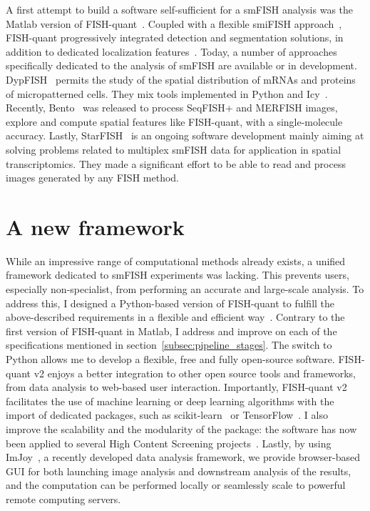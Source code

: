 A first attempt to build a software self-sufficient for a \ac{smFISH} analysis was the Matlab version of FISH-quant~\cite{mueller_fish-quant_2013}.
Coupled with a flexible \ac{smiFISH} approach~\cite{tsanov_smifish_2016}, FISH-quant progressively integrated detection and segmentation solutions, in addition to dedicated localization features~\cite{samacoits_computational_2018}.
Today, a number of approaches specifically dedicated to the analysis of \ac{smFISH} are available or in development.
DypFISH~\cite{savulescu_dypfish_2019,savulescu_interrogating_2021} permits the study of the spatial distribution of \ac{mRNA}s and proteins of micropatterned cells.
They mix tools implemented in Python and Icy~\cite{de_chaumont_icy_2012}.
Recently, Bento~\cite{mah_bento_2022} was released to process \ac{SeqFISH}+ and \ac{MERFISH} images, explore and compute spatial features like FISH-quant, with a single-molecule accuracy.
Lastly, StarFISH~\cite{perkel_starfish_2019} is an ongoing software development mainly aiming at solving problems related to multiplex \ac{smFISH} data for application in spatial transcriptomics.
They made a significant effort to be able to read and process images generated by any \ac{FISH} method.

\section{A new framework}
\label{sec:fqv2}

While an impressive range of computational methods already exists, a unified framework dedicated to \ac{smFISH} experiments was lacking.
This prevents users, especially non-specialist, from performing an accurate and large-scale analysis.
To address this, I designed a Python-based version of FISH-quant to fulfill the above-described requirements in a flexible and efficient way~\cite{Imbert_fq_2022}.
Contrary to the first version of FISH-quant in Matlab, I address and improve on each of the specifications mentioned in section~\ref{subsec:pipeline_stages}.
The switch to Python allows me to develop a flexible, free and fully open-source software.
FISH-quant v2 enjoys a better integration to other open source tools and frameworks, from data analysis to web-based user interaction.
Importantly, FISH-quant v2 facilitates the use of machine learning or deep learning algorithms with the import of dedicated packages, such as scikit-learn~\cite{pedregosa11a_scikitlearn} or TensorFlow~\cite{tensorflow_2015}.
I also improve the scalability and the modularity of the package: the software has now been applied to several High Content Screening projects~\cite{CHOUAIB_2020,safieddine_choreography_2021,pichon_kinesin_2021}.
Lastly, by using ImJoy~\cite{ouyang_imjoy_2019}, a recently developed data analysis framework, we provide browser-based \ac{GUI} for both launching image analysis and downstream analysis of the results, and the computation can be performed locally or seamlessly scale to powerful remote computing servers.

